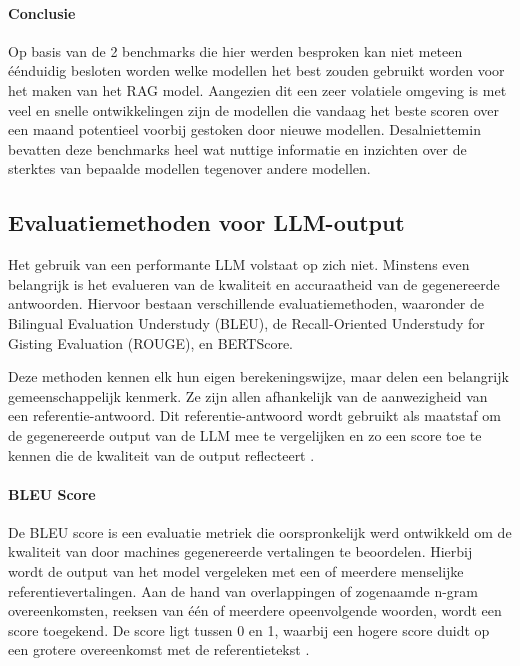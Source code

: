     \paragraph{Conclusie}
    
    Op basis van de 2 benchmarks die hier werden besproken kan niet meteen éénduidig besloten worden welke modellen het best zouden gebruikt worden voor het maken van het RAG model. Aangezien dit een zeer volatiele omgeving is met veel en snelle ontwikkelingen zijn de modellen die vandaag het beste scoren over een maand potentieel voorbij gestoken door nieuwe modellen. Desalniettemin bevatten deze benchmarks heel wat nuttige informatie en inzichten over de sterktes van bepaalde modellen tegenover andere modellen. 
    
    \subsection{Evaluatiemethoden voor LLM-output}
   
    Het gebruik van een performante LLM volstaat op zich niet. Minstens even belangrijk is het evalueren van de kwaliteit en accuraatheid van de gegenereerde antwoorden. Hiervoor bestaan verschillende evaluatiemethoden, waaronder de Bilingual Evaluation Understudy (BLEU), de Recall-Oriented Understudy for Gisting Evaluation (ROUGE), en BERTScore.  
    
    Deze methoden kennen elk hun eigen berekeningswijze, maar delen een belangrijk gemeenschappelijk kenmerk. Ze zijn allen afhankelijk van de aanwezigheid van een referentie-antwoord. Dit referentie-antwoord wordt gebruikt als maatstaf om de gegenereerde output van de LLM mee te vergelijken en zo een score toe te kennen die de kwaliteit van de output reflecteert \autocite{microsoft2024evaluation}.
    
    \paragraph{BLEU Score}
    
    De BLEU score is een evaluatie metriek die oorspronkelijk werd ontwikkeld om de kwaliteit van door machines gegenereerde vertalingen te beoordelen. Hierbij wordt de output van het model vergeleken met een of meerdere menselijke referentievertalingen. Aan de hand van overlappingen of zogenaamde n-gram overeenkomsten, reeksen van één of meerdere opeenvolgende woorden, wordt een score toegekend. De score ligt tussen 0 en 1, waarbij een hogere score duidt op een grotere overeenkomst met de referentietekst \autocite{papineni-etal-2002-bleu}.
    
